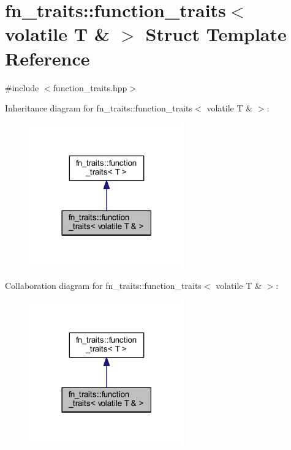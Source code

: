 \hypertarget{structfn__traits_1_1function__traits_3_01volatile_01_t_01_6_01_4}{}\section{fn\+\_\+traits\+:\+:function\+\_\+traits$<$ volatile T \& $>$ Struct Template Reference}
\label{structfn__traits_1_1function__traits_3_01volatile_01_t_01_6_01_4}


{\ttfamily \#include $<$function\+\_\+traits.\+hpp$>$}



Inheritance diagram for fn\+\_\+traits\+:\+:function\+\_\+traits$<$ volatile T \& $>$\+:\nopagebreak
\begin{figure}[H]
\begin{center}
\leavevmode
\includegraphics[width=189pt]{da/d1b/structfn__traits_1_1function__traits_3_01volatile_01_t_01_6_01_4__inherit__graph}
\end{center}
\end{figure}


Collaboration diagram for fn\+\_\+traits\+:\+:function\+\_\+traits$<$ volatile T \& $>$\+:\nopagebreak
\begin{figure}[H]
\begin{center}
\leavevmode
\includegraphics[width=189pt]{d2/d51/structfn__traits_1_1function__traits_3_01volatile_01_t_01_6_01_4__coll__graph}
\end{center}
\end{figure}


